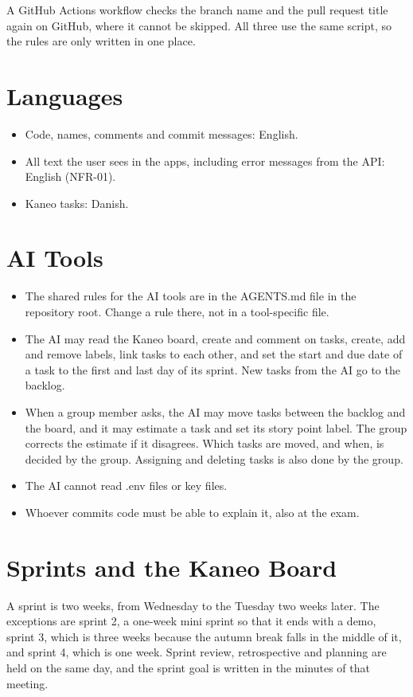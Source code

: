 \documentclass[a4paper,11pt]{article}
\begin{document}
A GitHub Actions workflow checks the branch name and the pull request title again on GitHub, where it cannot be skipped. All three use the same script, so the rules are only written in one place.

\section{Languages}
\begin{itemize}
    \item Code, names, comments and commit messages: English.
    \item All text the user sees in the apps, including error messages from the API: English (NFR-01).
    \item Kaneo tasks: Danish.
\end{itemize}

\section{AI Tools}
\begin{itemize}
    \item The shared rules for the AI tools are in the AGENTS.md file in the repository root. Change a rule there, not in a tool-specific file.
    \item The AI may read the Kaneo board, create and comment on tasks, create, add and remove labels, link tasks to each other, and set the start and due date of a task to the first and last day of its sprint. New tasks from the AI go to the backlog.
    \item When a group member asks, the AI may move tasks between the backlog and the board, and it may estimate a task and set its story point label. The group corrects the estimate if it disagrees. Which tasks are moved, and when, is decided by the group. Assigning and deleting tasks is also done by the group.
    \item The AI cannot read .env files or key files.
    \item Whoever commits code must be able to explain it, also at the exam.
\end{itemize}

\section{Sprints and the Kaneo Board}
A sprint is two weeks, from Wednesday to the Tuesday two weeks later. The exceptions are sprint 2, a one-week mini sprint so that it ends with a demo, sprint 3, which is three weeks because the autumn break falls in the middle of it, and sprint 4, which is one week. Sprint review, retrospective and planning are held on the same day, and the sprint goal is written in the minutes of that meeting.
\end{document}
